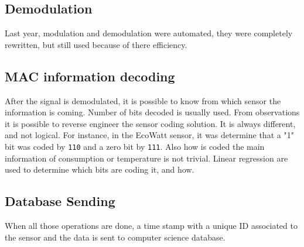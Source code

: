 \subsection{Demodulation}
Last year, modulation and demodulation were automated, they were completely rewritten, but still used because of there efficiency.
\subsection{MAC information decoding}
After the signal is demodulated, it is possible to know from which sensor the information is coming. Number of bits decoded is usually used.
From observations it is possible to reverse engineer the sensor coding solution. It is always different, and not logical. For instance, in the EcoWatt sensor, it was determine that a "1" bit was coded by \texttt{110} and a zero bit by \texttt{111}. Also how is coded the main information of consumption or temperature is not trivial. Linear regression are used to determine which bits are coding it, and how.
\subsection{Database Sending}
When all those operations are done, a time stamp with a unique ID associated to the sensor and the data is sent to computer science database.